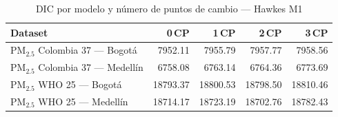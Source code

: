 \begin{table}[htbp]
\centering
\caption{DIC por modelo y n\'{u}mero de puntos de cambio --- Hawkes M1}
\label{tab:hawkes_dic}
\begin{tabular}{lrrrr}
\toprule
Dataset & 0\,CP & 1\,CP & 2\,CP & 3\,CP \\
\midrule
PM$_{2.5}$ Colombia 37 --- Bogot\'{a} & 7952.11 & 7955.79 & 7957.77 & 7958.56 \\
PM$_{2.5}$ Colombia 37 --- Medell\'{i}n & 6758.08 & 6763.14 & 6764.36 & 6773.69 \\
PM$_{2.5}$ WHO 25 --- Bogot\'{a} & 18793.37 & 18800.53 & 18798.50 & 18810.46 \\
PM$_{2.5}$ WHO 25 --- Medell\'{i}n & 18714.17 & 18723.19 & 18702.76 & 18782.43 \\
\bottomrule
\end{tabular}
\end{table}
